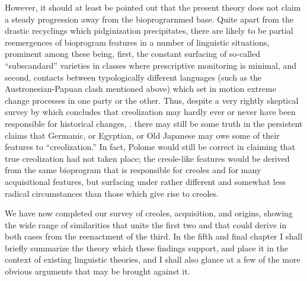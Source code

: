 However, it should at least be pointed out that the present theory does not claim a steady progression away from the biopro\-grarnmed base. Quite apart from the drastic recyclings which pidginiza\-tion precipitates, there are likely to be partial reemergences of bio\-program features in a number of linguistic situations, prominent among these being, first, the constant surfacing of so-called ``subscandard'' varieties in classes where prescriptive monitoring is minimal, and second, contacts between typologically different languages (such as the Austronesian-Papuan clash mentioned above) which set in motion extreme change processes in one party or the other. Thus, despite a very rightly skeptical survey by \citet{Polome1980} which concludes that creolization may hardly ever or never have been responsible for histo\-rical changes, . there may still be some truth in the persistent claims that Germanic, or Egyptian, or Old Japanese may owe some of their features to ``creolization.'' In fact, Polome would still be correct in claiming that true creolization had not taken place; the creole-like features would be derived from the same bioprogram that is responsible for creoles and for many acquisitional features, but surfacing under rather different and somewhat less radical circumstances than those which give rise to creoles.

We have now completed our survey of creoles, acquisition, and origins, showing the wide range of similarities that unite the first two and that could derive in both cases from the reenactment of the third. In the fifth and final chapter I shall briefly summarize the theory which these findings support, and place it in the context of existing linguistic theories, and I shall also glance at a few of the more obvious arguments that may be brought against it.

